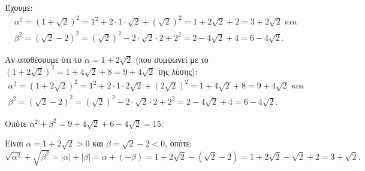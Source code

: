 
\begin{alist}
\item Έχουμε:
\begin{gather*}
\alpha^2 = (1 + \sqrt{2})^2 = 1^2 + 2 \cdot 1 \cdot \sqrt{2} + (\sqrt{2})^2 = 1 + 2\sqrt{2} + 2 = 3 + 2\sqrt{2}\text{ και} \\
\beta^2 = (\sqrt{2} - 2)^2 = (\sqrt{2})^2 - 2 \cdot \sqrt{2} \cdot 2 + 2^2 = 2 - 4\sqrt{2} + 4 = 6 - 4\sqrt{2}.
\end{gather*}

Αν υποθέσουμε ότι το $\alpha = 1+2\sqrt{2}$ (που συμφωνεί με το $(1+2\sqrt{2})^2 = 1 + 4\sqrt{2} + 8 = 9 + 4\sqrt{2}$ της λύσης):
\begin{gather*}
\alpha^2 = (1 + 2\sqrt{2})^2 = 1^2 + 2 \cdot 1 \cdot 2\sqrt{2} + (2\sqrt{2})^2 = 1 + 4\sqrt{2} + 8 = 9 + 4\sqrt{2}\text{ και} \\
\beta^2 = (\sqrt{2} - 2)^2 = (\sqrt{2})^2 - 2 \cdot \sqrt{2} \cdot 2 + 2^2 = 2 - 4\sqrt{2} + 4 = 6 - 4\sqrt{2}.
\end{gather*}

Οπότε $\alpha^2 + \beta^2 = 9 + 4\sqrt{2} + 6 - 4\sqrt{2} = 15$.

\item Είναι $\alpha = 1 + 2\sqrt{2} > 0$ και $\beta = \sqrt{2} - 2 < 0$, οπότε:
\[\sqrt{\alpha^2} + \sqrt{\beta^2} = |\alpha| + |\beta| = \alpha + (-\beta) = 1 + 2\sqrt{2} - (\sqrt{2} - 2) = 1 + 2\sqrt{2} - \sqrt{2} + 2 = 3 + \sqrt{2}.\]
\end{alist}

